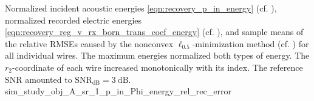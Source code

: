 %
{%
 Normalized incident acoustic energies
 \eqref{eqn:recovery_p_in_energy}
 (cf. ),
 normalized recorded electric energies
 \eqref{eqn:recovery_reg_v_rx_born_trans_coef_energy}
 (cf. ), and
 sample means of
 the relative \acfp{RMSE} caused by
 the nonconvex $\ell_{0.5}$-minimization method
 (cf. ) for
 all individual wires.
 The maximum energies normalized %
 both types of
 energy.
 The $r_{2}$-coordinate of
 each wire increased monotonically with
 its index.
 The reference \ac{SNR} amounted to
 $\text{SNR}_{\text{dB}} = \SI{3}{\deci\bel}$.
}%
{sim_study_obj_A_sr_1_p_in_Phi_energy_rel_rec_error}

